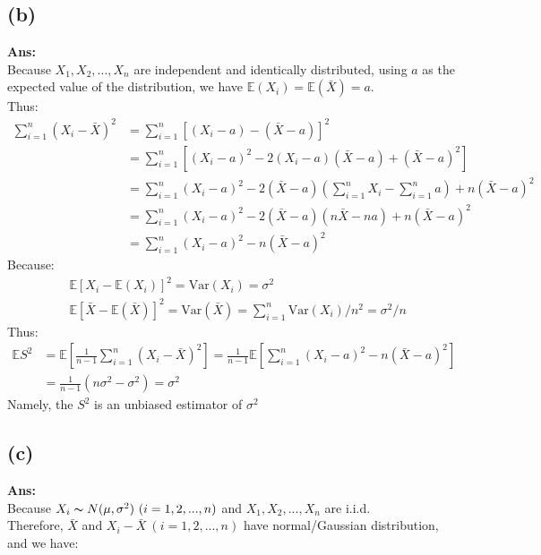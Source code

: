 \documentclass[twoside]{homework}
\begin{document}
\subsection*{(b)}
\textbf{Ans:}\\
Because $X_1, X_2, ..., X_n$ are independent and identically distributed, using $a$ as the expected value of the distribution, we have $\mathbb{E}(X_i)=\mathbb{E}(\bar{X})=a$. \\
Thus: 
\begin{equation}
\begin{aligned}
    \sum_{i=1}^n (X_i - \bar{X})^2 &= \sum_{i=1}^n [(X_i - a)-(\bar{X}-a)]^2 \\
    &=  \sum_{i=1}^n [(X_i - a)^2 -2(X_i - a)(\bar{X}-a) + (\bar{X}-a)^2] \\
    &= \sum_{i=1}^n (X_i - a)^2 - 2 (\bar{X}-a)(\sum_{i=1}^n X_i - \sum_{i=1}^n a) + n(\bar{X}-a)^2\\
    &= \sum_{i=1}^n (X_i - a)^2 - 2(\bar{X}-a)(n\bar{X}-na)+n(\bar{X}-a)^2\\
    &= \sum_{i=1}^n (X_i - a)^2 - n(\bar{X}-a)^2
\end{aligned}{}
\end{equation}{}
Because: 
\begin{equation}
\begin{aligned}
    &\mathbb{E}[X_i - \mathbb{E}(X_i)]^2 = \mathrm{Var}(X_i) = \sigma ^2 \\
    &\mathbb{E}[\bar{X} - \mathbb{E}(\bar{X})]^2 = \mathrm{Var}(\bar{X}) = \sum_{i=1}^n \mathrm{Var}(X_i)/n^2 = \sigma ^2 / n
\end{aligned}
\end{equation}{}
Thus:
\begin{equation}
\begin{aligned}
    \mathbb{E}S^2 &= \mathbb{E} [\frac{1}{n-1} \sum_{i=1}^n(X_i - \bar{X})^2] = \frac{1}{n-1} \mathbb{E} [\sum_{i=1}^n (X_i - a)^2 - n(\bar{X}-a)^2]\\
    &= \frac{1}{n-1} (n \sigma ^2 - \sigma ^2) = \sigma ^2
\end{aligned}
\end{equation}
Namely, the $S^2$ is an unbiased estimator of $\sigma ^2$

\subsection*{(c)}
\textbf{Ans:}\\
Because $X_i \thicksim N(\mu, \sigma ^2)\  (i=1,2,...,n)$ and $X_1, X_2, ..., X_n$ are i.i.d.\\
Therefore, $\bar{X}$ and $X_i-\bar{X}\  (i=1,2,...,n)$ have normal/Gaussian distribution, and we have:
\end{document}

